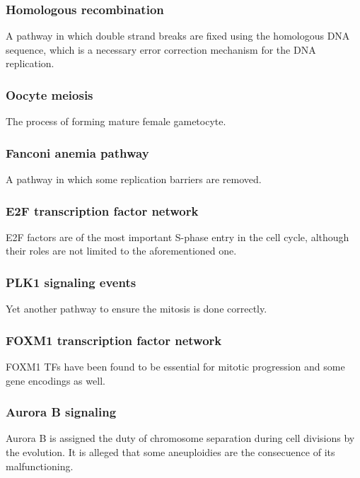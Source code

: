 \documentclass[3p,authoryear,preprint,12pt]{elsarticle}
\begin{document}
\subsubsection{Homologous recombination}
A pathway in which double strand breaks are fixed using the homologous DNA sequence, which is a necessary error correction mechanism for the DNA replication. %

\subsubsection{Oocyte meiosis}
The process of forming mature female gametocyte.

\subsubsection{Fanconi anemia pathway}
A pathway in which some replication barriers are removed. %

\subsubsection{E2F transcription factor network}
E2F factors are of the most important S-phase entry in the cell cycle, although their roles are not limited to the aforementioned one. %

\subsubsection{PLK1 signaling events}
Yet another pathway to ensure the mitosis is done correctly. %

\subsubsection{FOXM1 transcription factor network}
FOXM1 TFs have been found to be essential for mitotic progression and some gene encodings as well. %

\subsubsection{Aurora B signaling}
Aurora B is assigned the duty of chromosome separation during cell divisions by the evolution. %
It is alleged that some aneuploidies are the consecuence of its malfunctioning.
\end{document}
